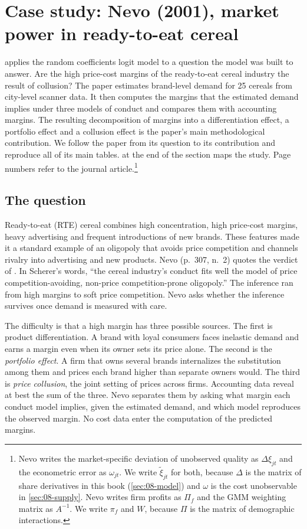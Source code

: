 \section{Case study: Nevo (2001), market power in ready-to-eat cereal}\label{sec:08-nevo01}

\citet{Nevo2001} applies the random coefficients logit model to a question the model was built to answer. Are
the high price-cost margins of the ready-to-eat cereal industry the result of collusion? The paper estimates
brand-level demand for 25 cereals from city-level scanner data. It then computes the margins that the estimated
demand implies under three models of conduct and compares them with accounting margins. The resulting
decomposition of margins into a differentiation effect, a portfolio effect and a collusion effect is the
paper's main methodological contribution. We follow the paper from its question to its contribution and
reproduce all of its main tables.  at the end of the section maps the study. Page
numbers refer to the journal article.\footnote{Nevo writes the
market-specific deviation of unobserved quality as $\Delta\xi_{jt}$ and the econometric error as
$\omega_{jt}$. We write $\tilde\xi_{jt}$ for both, because $\Delta$ is the matrix of share derivatives in this
book (\cref{sec:08-model}) and $\omega$ is the cost unobservable in \cref{sec:08-supply}. Nevo writes firm
profits as $\Pi_f$ and the GMM weighting matrix as $A^{-1}$. We write $\pi_f$ and $W$, because $\Pi$ is the
matrix of demographic interactions.}

\subsection{The question}\label{sec:08-nevo01-question}

Ready-to-eat (RTE) cereal combines high concentration, high price-cost margins, heavy advertising and frequent
introductions of new brands. These features made it a standard example of an oligopoly that avoids price
competition and channels rivalry into advertising and new products. Nevo (p.~307, n.~2) quotes the verdict of
\citet[p.~189]{Scherer1982}. In Scherer's words, ``the cereal industry's conduct fits well the model of price
competition-avoiding, non-price competition-prone oligopoly.'' The inference ran from high margins to soft price
competition. Nevo asks whether the inference survives once demand is measured with care.

The difficulty is that a high margin has three possible sources. The first is product differentiation. A brand
with loyal consumers faces inelastic demand and earns a margin even when its owner sets its price alone. The
second is the \emph{portfolio effect}. A firm that owns several brands internalizes the substitution among them
and prices each brand higher than separate owners would. The third is \emph{price collusion}, the joint setting
of prices across firms. Accounting data reveal at best the sum of the three. Nevo separates them by asking what
margin each conduct model implies, given the estimated demand, and which model reproduces the observed margin.
No cost data enter the computation of the predicted margins.

